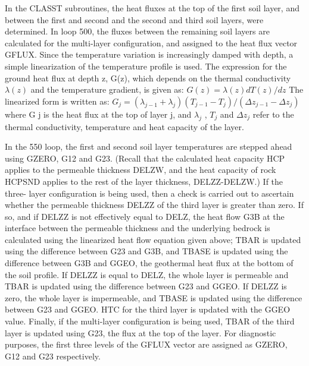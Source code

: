 In the C\+L\+A\+S\+S\+T subroutines, the heat fluxes at the top of the first soil layer, and between the first and second and the second and third soil layers, were determined. In loop 500, the fluxes between the remaining soil layers are calculated for the multi-\/layer configuration, and assigned to the heat flux vector G\+F\+L\+U\+X. Since the temperature variation is increasingly damped with depth, a simple linearization of the temperature profile is used. The expression for the ground heat flux at depth z, G(z), which depends on the thermal conductivity $\lambda (z)$ and the temperature gradient, is given as\+: $G(z) = \lambda (z) dT(z)/dz$ The linearized form is written as\+: $G_j = (\lambda_{j-1} + \lambda_j ) (T_{j-1} - T_j ) / (\Delta z_{j-1} - \Delta z_j )$ where G j is the heat flux at the top of layer j, and $\lambda_j$ , $T_j$ and $\Delta z_j$ refer to the thermal conductivity, temperature and heat capacity of the layer.

In the 550 loop, the first and second soil layer temperatures are stepped ahead using G\+Z\+E\+R\+O, G12 and G23. (Recall that the calculated heat capacity H\+C\+P applies to the permeable thickness D\+E\+L\+Z\+W, and the heat capacity of rock H\+C\+P\+S\+N\+D applies to the rest of the layer thickness, D\+E\+L\+Z\+Z-\/\+D\+E\+L\+Z\+W.) If the three-\/ layer configuration is being used, then a check is carried out to ascertain whether the permeable thickness D\+E\+L\+Z\+Z of the third layer is greater than zero. If so, and if D\+E\+L\+Z\+Z is not effectively equal to D\+E\+L\+Z, the heat flow G3\+B at the interface between the permeable thickness and the underlying bedrock is calculated using the linearized heat flow equation given above; T\+B\+A\+R is updated using the difference between G23 and G3\+B, and T\+B\+A\+S\+E is updated using the difference between G3\+B and G\+G\+E\+O, the geothermal heat flux at the bottom of the soil profile. If D\+E\+L\+Z\+Z is equal to D\+E\+L\+Z, the whole layer is permeable and T\+B\+A\+R is updated using the difference between G23 and G\+G\+E\+O. If D\+E\+L\+Z\+Z is zero, the whole layer is impermeable, and T\+B\+A\+S\+E is updated using the difference between G23 and G\+G\+E\+O. H\+T\+C for the third layer is updated with the G\+G\+E\+O value. Finally, if the multi-\/layer configuration is being used, T\+B\+A\+R of the third layer is updated using G23, the flux at the top of the layer. For diagnostic purposes, the first three levels of the G\+F\+L\+U\+X vector are assigned as G\+Z\+E\+R\+O, G12 and G23 respectively.

